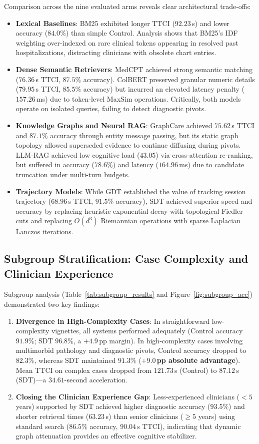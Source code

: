 \documentclass[12pt]{article}
\begin{document}
Comparison across the nine evaluated arms reveals clear architectural trade-offs:
\begin{itemize}
  \item \textbf{Lexical Baselines}: BM25 exhibited longer TTCI ($92.23$\,s) and lower accuracy ($84.0\%$) than simple Control. Analysis shows that BM25's IDF weighting over-indexed on rare clinical tokens appearing in resolved past hospitalizations, distracting clinicians with obsolete chart entries.
  \item \textbf{Dense Semantic Retrievers}: MedCPT achieved strong semantic matching ($76.36$\,s TTCI, $87.5\%$ accuracy). ColBERT preserved granular numeric details ($79.95$\,s TTCI, $85.5\%$ accuracy) but incurred an elevated latency penalty ($157.26$\,ms) due to token-level MaxSim operations. Critically, both models operate on isolated queries, failing to detect diagnostic pivots.
  \item \textbf{Knowledge Graphs and Neural RAG}: GraphCare achieved $75.62$\,s TTCI and $87.1\%$ accuracy through entity message passing, but its static graph topology allowed superseded evidence to continue diffusing during pivots. LLM-RAG achieved low cognitive load ($43.05$) via cross-attention re-ranking, but suffered in accuracy ($78.6\%$) and latency ($164.96$\,ms) due to candidate truncation under multi-turn budgets.
  \item \textbf{Trajectory Models}: While GDT established the value of tracking session trajectory ($68.96$\,s TTCI, $91.5\%$ accuracy), SDT achieved superior speed and accuracy by replacing heuristic exponential decay with topological Fiedler cuts and replacing $O(d^3)$ Riemannian operations with sparse Laplacian Lanczos iterations.
\end{itemize}

\subsection*{Subgroup Stratification: Case Complexity and Clinician Experience}

Subgroup analysis (Table~\ref{tab:subgroup_results} and Figure~\ref{fig:subgroup_acc}) demonstrated two key findings:
\begin{enumerate}[(1)]
  \item \textbf{Divergence in High-Complexity Cases}: In straightforward low-complexity vignettes, all systems performed adequately (Control accuracy $91.9\%$; SDT $96.8\%$, a $+4.9$\,pp margin). In high-complexity cases involving multimorbid pathology and diagnostic pivots, Control accuracy dropped to $82.3\%$, whereas SDT maintained $\mathbf{91.3\%}$ (\textbf{$+9.0$\,pp absolute advantage}). Mean TTCI on complex cases dropped from $121.73$\,s (Control) to $87.12$\,s (SDT)---a $34.61$-second acceleration.
  \item \textbf{Closing the Clinician Experience Gap}: Less-experienced clinicians ($<5$ years) supported by SDT achieved higher diagnostic accuracy ($93.5\%$) and shorter retrieval times ($63.23$\,s) than senior clinicians ($\ge 5$ years) using standard search ($86.5\%$ accuracy, $90.04$\,s TTCI), indicating that dynamic graph attenuation provides an effective cognitive stabilizer.
\end{enumerate}
\end{document}
